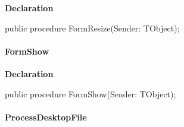 \documentclass{report}
\newif\ifpdf
\begin{document}
\label{manager.TMnFrm-FormResize}
\begin{list}{}{
\setlength{\itemindent}{0cm}
\setlength{\listparindent}{0cm}
\setlength{\leftmargin}{\evensidemargin}
\addtolength{\leftmargin}{\tmplength}
\settowidth{\labelsep}{X}
\addtolength{\leftmargin}{\labelsep}
\setlength{\labelwidth}{\tmplength}
}
\item[\textbf{Declaration}\hfill]
\ifpdf
\begin{flushleft}
\fi
\begin{ttfamily}
public procedure FormResize(Sender: TObject);\end{ttfamily}

\ifpdf
\end{flushleft}
\fi

\end{list}
\paragraph*{FormShow}\hspace*{\fill}

\label{manager.TMnFrm-FormShow}
\begin{list}{}{
\setlength{\itemindent}{0cm}
\setlength{\listparindent}{0cm}
\setlength{\leftmargin}{\evensidemargin}
\addtolength{\leftmargin}{\tmplength}
\settowidth{\labelsep}{X}
\addtolength{\leftmargin}{\labelsep}
\setlength{\labelwidth}{\tmplength}
}
\item[\textbf{Declaration}\hfill]
\ifpdf
\begin{flushleft}
\fi
\begin{ttfamily}
public procedure FormShow(Sender: TObject);\end{ttfamily}

\ifpdf
\end{flushleft}
\fi

\end{list}
\paragraph*{ProcessDesktopFile}\hspace*{\fill}
\end{document}

